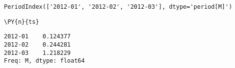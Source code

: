             \begin{tcolorbox}[breakable, size=fbox, boxrule=.5pt, pad at break*=1mm, opacityfill=0]
\begin{Verbatim}[commandchars=\\\{\}]
PeriodIndex(['2012-01', '2012-02', '2012-03'], dtype='period[M]')
\end{Verbatim}
\end{tcolorbox}
        
    \begin{tcolorbox}[breakable, size=fbox, boxrule=1pt, pad at break*=1mm,colback=cellbackground, colframe=cellborder]
\begin{Verbatim}[commandchars=\\\{\}]
\PY{n}{ts}
\end{Verbatim}
\end{tcolorbox}

            \begin{tcolorbox}[breakable, size=fbox, boxrule=.5pt, pad at break*=1mm, opacityfill=0]
\begin{Verbatim}[commandchars=\\\{\}]
2012-01    0.124377
2012-02    0.244281
2012-03    1.218229
Freq: M, dtype: float64
\end{Verbatim}
\end{tcolorbox}
